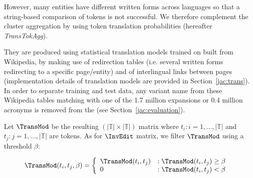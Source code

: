 \documentclass[output=paper]{langsci/langscibook}
\begin{document}
\begin{table}[h]
\centering
\caption{Example of clusters aggregated on the basis of translated tokens}
\label{jac:tab:translated token aggregation}
\end{table}


However, many entities have different written forms across languages
so that a string-based comparison of tokens is not successful. We
therefore complement the cluster aggregation by using token
translation probabilities (hereafter \textit{TransTokAgg}).

They are produced using statistical translation models trained on
 built from Wikipedia, by making use of redirection
tables (i.e.  several written forms redirecting to a specific
page/entity) and of interlingual links between pages (implementation
details of translation models are provided in Section~\ref{jac:trans}).
In order to separate training and test data, any variant name from
these Wikipedia tables matching with one of the 1.7 million expansions
or 0.4 million acronyms is removed from the  (see
Section~\ref{jac:evaluation}).

Let $\TransMod$ be the resulting $(|\mathbb{T}| \times |\mathbb{T}|)$
 matrix where $t_i : i = 1,...,|\mathbb{T}|$ and $t_j
: j = 1,...,|\mathbb{T}|$ are tokens.  As for $\InvEdit$ matrix, we
filter $\TransMod$ using a threshold $\beta$:

\begin{equation}
\TransMod(t_i,t_j,\beta) =
\left\{
  \begin{array}{lr}
    \TransMod(t_i,t_j) & : \TransMod(t_i,t_j) \ge \beta\\
    0 & : \TransMod(t_i,t_j) < \beta
  \end{array}
\right.
\end{equation}
\end{document}
